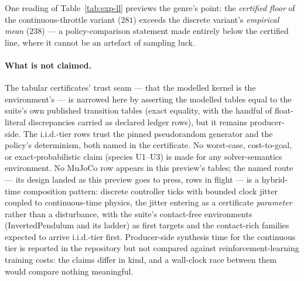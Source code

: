 \begin{table}[htbp]
\centering\small

\caption{First i.i.d.-tier rows (species U5 of
section~\ref{sec:exp-claims}; confidence-qualified: each bound
holds with probability $\ge 1-\alpha$ over the sampling; never to be
read as almost-sure). Policies are the suite's own heuristic
controllers; $n = 10^6$ episodes each; the almost-sure return range
required by the bound is itself a certified lemma about the
environment's code, not an assumption. Bound-cell tints are the
win-tint ladder of section~\ref{sec:exp-conventions}, read against
the registry threshold beside them.}
\label{tab:exp-ll}
\end{table}

One reading of Table~\ref{tab:exp-ll} previews the genre's point: the
\emph{certified floor} of the continuous-throttle variant ($281$)
exceeds the discrete variant's \emph{empirical mean} ($238$) --- a
policy-comparison statement made entirely below the certified line,
where it cannot be an artefact of sampling luck.

\paragraph{What is not claimed.} The tabular certificates' trust seam
--- that the modelled kernel is the environment's --- is narrowed here
by asserting the modelled tables equal to the suite's own published
transition tables (exact equality, with the handful of float-literal
discrepancies carried as declared ledger rows), but it remains
producer-side. The i.i.d.-tier rows trust the pinned
pseudorandom generator and the policy's determinism, both named in
the certificate. No worst-case, cost-to-goal, or exact-probabilistic
claim (species U1--U3) is made for any solver-semantics environment. No MuJoCo
row appears in this preview's tables; the named route --- its design
landed as this preview goes to press, rows in flight --- is a
hybrid-time composition pattern: discrete controller ticks with
bounded clock jitter coupled to continuous-time physics, the jitter
entering as a certificate \emph{parameter} rather than a disturbance,
with the suite's contact-free environments (InvertedPendulum and its
ladder) as first targets and the contact-rich families expected to
arrive i.i.d.-tier first. Producer-side synthesis time for the continuous
tier is reported in the repository but not compared against
reinforcement-learning training costs: the claims differ in kind, and
a wall-clock race between them would compare nothing meaningful.
